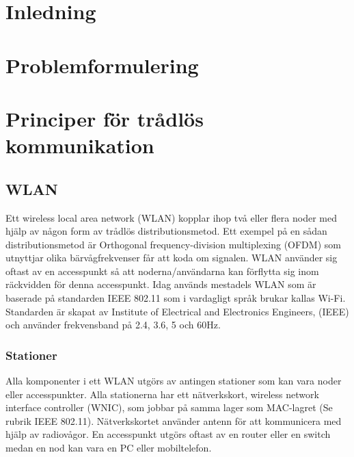 \documentclass[a4paper,12pt,fleqn]{article}
\begin{document}
\addto\captionsswedish{\renewcommand{\contentsname}{Innehållsförteckning}}

\tableofcontents
\thispagestyle{fancy}
\newpage

\section{Inledning}
\section{Problemformulering}
\section{Principer för trådlös kommunikation}
\subsection{WLAN}
Ett wireless local area network (WLAN) kopplar ihop två eller flera noder med hjälp av någon form av trådlös distributionsmetod. Ett exempel på en sådan distributionsmetod är Orthogonal frequency-division multiplexing (OFDM) som utnyttjar olika bärvågfrekvenser får att koda om signalen. WLAN använder sig oftast av en accesspunkt så att noderna/användarna kan förflytta sig inom räckvidden för denna accesspunkt. Idag används mestadels WLAN som är baserade på standarden IEEE 802.11 som i vardagligt språk brukar kallas Wi-Fi. Standarden är skapat av Institute of Electrical and Electronics Engineers, (IEEE) och använder frekvensband på 2.4, 3.6, 5 och 60Hz.

\subsubsection{Stationer}
Alla komponenter i ett WLAN utgörs av antingen stationer som kan vara noder eller accesspunkter. Alla stationerna har ett nätverkskort, wireless network interface controller (WNIC), som jobbar på samma lager som MAC-lagret (Se rubrik IEEE 802.11). Nätverkskortet använder antenn för att kommunicera med hjälp av radiovågor. En accesspunkt utgörs oftast av en router eller en switch medan en nod kan vara en PC eller mobiltelefon. 
\end{document}
